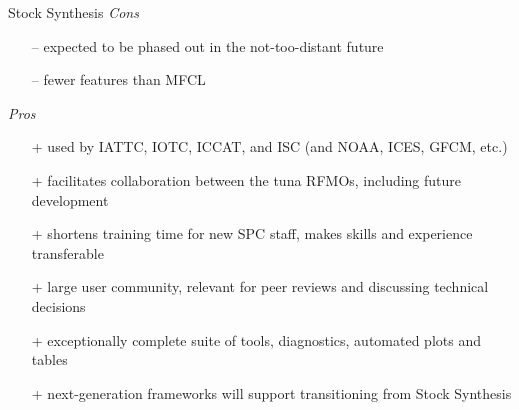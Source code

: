 \documentclass[aspectratio=169,fleqn]{beamer}
\begin{document}

\begin{frame}{Stock Synthesis}
  \textit{Cons}
  \begin{itemize}
    \item[--] expected to be phased out in the not-too-distant future\\[1ex]
    \item[--] fewer features than MFCL\\[3ex]
  \end{itemize}
  \textit{Pros}
  \begin{itemize}
    \item[+] used by IATTC, IOTC, ICCAT, and ISC (and NOAA, ICES, GFCM,
    etc.)\\[1ex]
    \item[+] facilitates collaboration between the tuna RFMOs, including future
    development\\[1ex]
    \item[+] shortens training time for new SPC staff, makes skills and
    experience transferable\\[1ex]
    \item[+] large user community, relevant for peer reviews and discussing
    technical decisions\\[1ex]
    \item[+] exceptionally complete suite of tools, diagnostics, automated plots
    and tables\\[1ex]
    \item[+] next-generation frameworks will support transitioning from Stock
    Synthesis\\[1ex]
  \end{itemize}
\end{frame}

\end{document}
